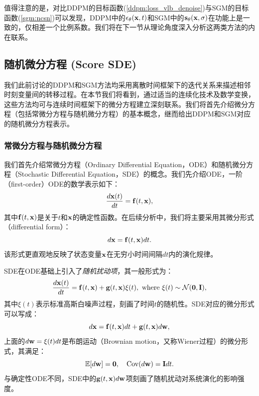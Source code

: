 \documentclass[11pt,a4paper,UTF8]{ctexart}
\begin{document}
值得注意的是，对比DDPM的目标函数(\ref{ddpm:loss_vlb_denoise})与SGM的目标函数(\ref{sgm:ncsn})可以发现，DDPM中的$\epsilon_{\theta}(\mathbf{x},t)$和SGM中的$\mathbf{s}_\theta(\mathbf{x},\sigma)$在功能上是一致的，仅相差一个比例系数。我们将在下一节从理论角度深入分析这两类方法的内在联系。


\subsection{随机微分方程 (Score SDE)}
\label{subsection:sde}

我们此前讨论的DDPM和SGM方法均采用离散时间框架下的迭代关系来描述相邻时刻变量间的转移过程。在本节我们将看到，通过适当的连续化技术及数学变换，这些方法均可与连续时间框架下的微分方程建立深刻联系。我们将首先介绍微分方程（包括常微分方程与随机微分方程）的基本概念，继而给出DDPM和SGM对应的随机微分方程表示。

\subsubsection{常微分方程与随机微分方程}

我们首先介绍常微分方程（Ordinary Differential Equation，ODE）和随机微分方程（Stochastic Differential Equation，SDE）的概念。我们先介绍ODE，一阶（first-order）ODE的数学表示如下：
\begin{equation*}
    \frac{d\mathbf{x}(t)}{dt}=\mathbf{f}(t,\mathbf{x}),
\end{equation*}
其中$\mathbf{f}(t,\mathbf{x})$是关于$t$和$\mathbf{x}$的确定性函数。在后续分析中，我们将主要采用其微分形式（differential form）：
\begin{equation*}
    d\mathbf{x}=\mathbf{f}(t,\mathbf{x})dt.
\end{equation*}
该形式更直观地反映了状态变量$\mathbf{x}$在无穷小时间间隔$dt$内的演化规律。

SDE在ODE基础上引入了\emph{随机扰动项}，其一般形式为：
\begin{equation*}
    \frac{d\x(t)}{dt}=\f(t,\x) + \mathbf{g}(t,\x)\xi(t),\ \text{where}\ \xi(t)\sim\N(\mathbf{0},\mathbf{I}),
\end{equation*}
其中$\xi(t)$表示标准高斯白噪声过程，刻画了时间$t$的随机性。SDE对应的微分形式可以写成：
\begin{equation*}
    d\mathbf{x}=\mathbf{f}(t,\mathbf{x})dt + \mathbf{g}(t,\mathbf{x})d\mathbf{w},
\end{equation*}
上面的$d\mathbf{w}=\xi(t)dt$是布朗运动（Brownian motion，又称Wiener过程）的微分形式，其满足：
\begin{equation*}
\mathbb{E}[d\mathbf{w}] = \mathbf{0}, \quad \text{Cov}(d\mathbf{w}) = \mathbf{I}dt.
\end{equation*}
与确定性ODE不同，SDE中的$\mathbf{g}(t,\mathbf{x})d\mathbf{w}$项刻画了随机扰动对系统演化的影响强度。
\end{document}
